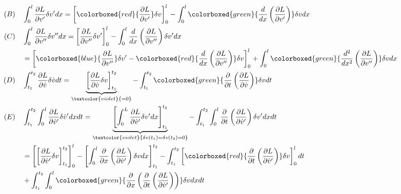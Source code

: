 \documentclass[10pt,a4paper]{scrartcl}
\begin{document}
\begin{multicols*}{2}
\begin{align*}
(B)\quad&\int_0^l\frac{\partial L}{\partial v'}\delta v' dx = \left[\colorboxed{red}{\frac{\partial L}{\partial v'}}\delta v\right]_0^l-\int_0^l\colorboxed{green}{\frac{d}{dx}\left(\frac{\partial L}{\partial v'}\right)}\delta v dx\\
(C)\quad&\int_0^l\frac{\partial L}{\partial v''}\delta v''dx = \left[\frac{\partial L}{\partial v''}\delta v'\right]_0^l-\int_0^l\frac{d}{dx}\left(\frac{\partial L}{\partial v''}\right)\delta v' dx\\
&=\left[\colorboxed{blue}{\frac{\partial L}{\partial v''}}\delta v'-\colorboxed{red}{\frac{d}{dx}\left(\frac{\partial L}{\partial v''}\right)}\delta v\right]_0^l+\int_0^l\colorboxed{green}{\frac{d^2}{dx^2}\left(\frac{\partial L}{\partial v''}\right)}\delta v dx\\
(D)\quad&\int_{t_1}^{t_2}\frac{\partial L}{\partial \dot{v}}\delta\dot{v} dt=\underbrace{\left[\frac{\partial L}{\partial\dot{v}}\delta v\right]_{t_1}^{t_2}}_{\textcolor{violet}{=0}}-\int_{t_1}^{t_2}\colorboxed{green}{\frac{\partial }{\partial t}\left(\frac{\partial L}{\partial \dot{v}}\right)}\delta v d t\\
(E)\quad&\int_{t_1}^{t_2}\int_0^l\frac{\partial L}{\partial \dot{v}'}\delta \dot{v}'dx dt = \underbrace{\left[\int_0^L\frac{\partial L}{\partial\dot{v}'}\delta v' dx\right]_{t_1}^{t_2}}_{\textcolor{violet}{\tiny \delta v(t_1)=\delta v(t_2) = 0}}-\int_{t_1}^{t_2}\int_0^l\frac{\partial}{\partial t}\left(\frac{\partial L}{\partial \dot{v}'}\right)\delta v' dx dt \\
&=\left[\left[\frac{\partial L}{\partial \dot{v}'}\delta v\right]_{t_1}^{t_2}\right]_0^l-\left[\int_0^l\frac{\partial}{\partial x}\left(\frac{\partial L}{\partial \dot{v}'}\right)\delta v dx\right]_{t_1}^{t_2}-\int_{t_1}^{t_2}\left[\colorboxed{red}{\frac{\partial}{\partial t}\left(\frac{\partial L}{\partial\dot{v}'}\right)}\delta v\right]_0^ldt\\
&+\int_{t_1}^{t_2}\int_0^l\colorboxed{green}{\frac{\partial}{\partial x}\left(\frac{\partial}{\partial t}\left(\frac{\partial L}{\partial\dot{v}'}\right)\right)}\delta v dx dt
\end{align*}



\end{multicols*}
\end{document}
